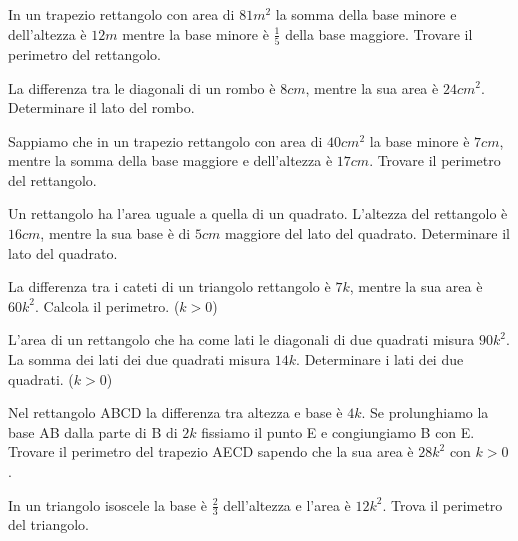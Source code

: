 \begin{multicols}{2}
\begin{esercizio}[\Ast]
 \label{ese:6.64}
In un trapezio rettangolo con area di $81\unit{m^2}$ la somma della base minore e dell'altezza è $12\unit{m}$ mentre la base minore è $\frac 1 5$ della base maggiore. Trovare il perimetro del rettangolo.
\end{esercizio}

\begin{esercizio}[\Ast]
 \label{ese:6.65}
La differenza tra le diagonali di un rombo è $8\unit{cm}$, mentre la sua area è $24\unit{{cm}^2}$. Determinare il lato del rombo.
\end{esercizio}

\begin{esercizio}[\Ast]
 \label{ese:6.66}
Sappiamo che in un trapezio rettangolo con area di $40\unit{{cm}^2}$ la base minore è $7\unit{cm}$, mentre la somma della base maggiore e dell'altezza è $17\unit{cm}$. Trovare il perimetro del rettangolo.
\end{esercizio}

\begin{esercizio}[\Ast]
 \label{ese:6.67}
Un rettangolo ha l'area uguale a quella di un quadrato. L'altezza del rettangolo è $16\unit{cm}$, mentre la sua base è di $5\unit{cm}$ maggiore del lato del quadrato. Determinare il lato del quadrato.
\end{esercizio}

\begin{esercizio}[\Ast]
 \label{ese:6.68}
La differenza tra i cateti di un triangolo rettangolo è $7k$, mentre la sua area è $60 k^2$. Calcola il perimetro. ($k>0$)
\end{esercizio}

\begin{esercizio}[\Ast]
 \label{ese:6.69}
L'area di un rettangolo che ha come lati le diagonali di due quadrati misura $90 k^2$. La somma dei lati dei due quadrati misura $14k$. Determinare i lati dei due quadrati. ($ k>0 $)
\end{esercizio}

\begin{esercizio}[\Ast]
 \label{ese:6.70}
Nel rettangolo ABCD la differenza tra altezza e base è $4k$. Se prolunghiamo la base AB dalla parte di B di $2k$ fissiamo il punto E e congiungiamo B con E. Trovare il perimetro del trapezio AECD sapendo che la sua area è $28k^2$ con $k>0$.
\end{esercizio}

\begin{esercizio}[\Ast]
 \label{ese:6.71}
In un triangolo isoscele la base è $ \frac 2 3 $ dell'altezza e l'area è $12k^2$. Trova il perimetro del triangolo.
\end{esercizio}
\end{multicols}

